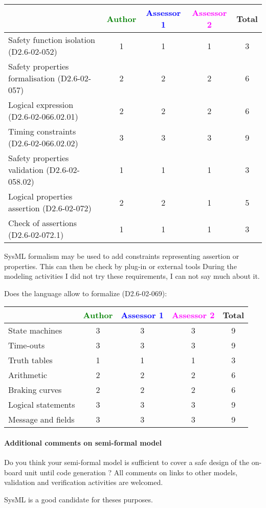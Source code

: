 \begin{tabular}{|l | c | c | c | c|}
\hline
& \textcolor{green}{Author} & \textcolor{blue}{Assessor 1} & \textcolor{magenta}{Assessor 2} & Total \\
\hline 
Safety function isolation (D2.6-02-052)  & 1& 1& 1 & 3 \\
\hline 
Safety properties formalisation (D2.6-02-057)  &2 & 2& 2  & 6 \\
\hline
Logical expression (D2.6-02-066.02.01)  &2 & 2& 2& 6 \\
\hline
Timing constraints (D2.6-02-066.02.02)  &3 & 3 & 3& 9 \\
\hline
Safety properties validation (D2.6-02-058.02)  &1 & 1& 1& 3 \\
\hline
Logical properties assertion (D2.6-02-072)  &2 & 2& 1 & 5 \\
\hline
Check  of assertions (D2.6-02-072.1)  &1 & 1& 1 & 3  \\
\hline
\end{tabular}
\begin{author_comment}
SysML formalism may be used to add constraints representing assertion
or properties. This can then be check by plug-in or external tools
During the modeling activities I did not try these requirements, I can
not say much about it.
\end{author_comment}
Does the language allow to  formalize (D2.6-02-069):

\begin{tabular}{|l | c | c | c | c|}
\hline
& \textcolor{green}{Author} & \textcolor{blue}{Assessor 1} & \textcolor{magenta}{Assessor 2} & Total \\
\hline 
State machines  &3 & 3& 3& 9 \\
\hline
Time-outs  &3 & 3& 3& 9 \\
\hline
Truth tables  &1 &1 & 1& 3  \\
\hline
Arithmetic  &2 & 2& 2& 6 \\
\hline
Braking curves  &2 & 2& 2& 6  \\
\hline
Logical statements &3 & 3& 3& 9  \\
\hline
Message and fields &3 & 3&3 & 9  \\
\hline
\end{tabular}

\paragraph{Additional comments on semi-formal  model} Do you think your semi-formal  model is sufficient to cover a safe design of the on-board unit until code generation ?
All comments on links to  other models, validation and verification activities are welcomed.
\begin{author_comment}
SysML \cite{sysmlbook} is a good candidate for theses purposes.
\end{author_comment}
